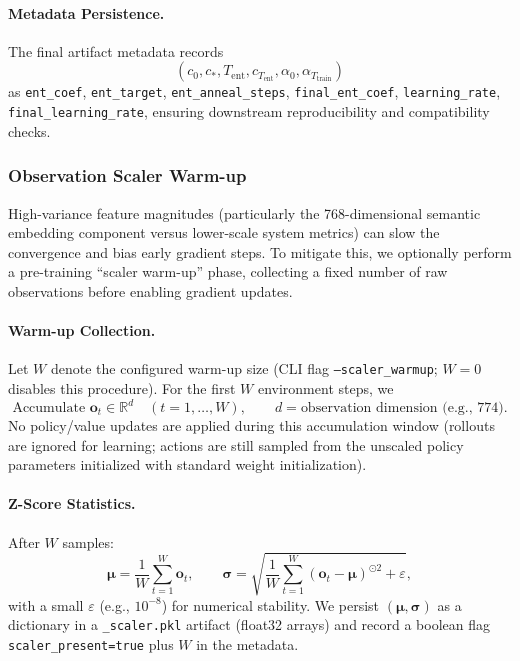 \paragraph{Metadata Persistence.}
The final artifact metadata records
\[
(c_0, c_\ast, T_{\text{ent}}, c_{T_{\text{ent}}}, \alpha_0, \alpha_{T_{\text{train}}})
\]
as \texttt{ent\_coef}, \texttt{ent\_target}, \texttt{ent\_anneal\_steps}, \texttt{final\_ent\_coef}, \texttt{learning\_rate}, \texttt{final\_learning\_rate}, ensuring downstream reproducibility and compatibility checks.

\subsubsection{Observation Scaler Warm-up}

High-variance feature magnitudes (particularly the 768-dimensional semantic embedding component versus lower-scale system metrics) can slow the convergence and bias early gradient steps. To mitigate this, we optionally perform a pre-training ``scaler warm-up'' phase, collecting a fixed number of raw observations before enabling gradient updates.

\paragraph{Warm-up Collection.}
Let $W$ denote the configured warm-up size (CLI flag \texttt{--scaler\_warmup}; $W=0$ disables this procedure). For the first $W$ environment steps, we
\[
\text{Accumulate } \mathbf{o}_t \in \mathbb{R}^d \quad (t = 1,\dots,W), \qquad d = \text{observation dimension (e.g., } 774\text{)}.
\]
No policy/value updates are applied during this accumulation window (rollouts are ignored for learning; actions are still sampled from the unscaled policy parameters initialized with standard weight initialization).

\paragraph{Z-Score Statistics.}
After $W$ samples:
\[
\boldsymbol{\mu} = \frac{1}{W}\sum_{t=1}^{W} \mathbf{o}_t, 
\qquad
\boldsymbol{\sigma} = \sqrt{\frac{1}{W}\sum_{t=1}^{W} (\mathbf{o}_t - \boldsymbol{\mu})^{\odot 2} + \varepsilon},
\]
with a small $\varepsilon$ (e.g., $10^{-8}$) for numerical stability. We persist $(\boldsymbol{\mu}, \boldsymbol{\sigma})$ as a dictionary in a \texttt{\_scaler.pkl} artifact (float32 arrays) and record a boolean flag \texttt{scaler\_present=true} plus $W$ in the metadata.

